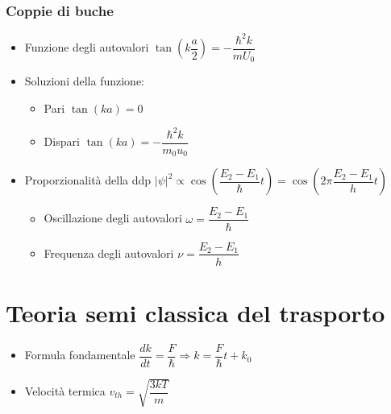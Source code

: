 \documentclass{article}
\begin{document}
\newpage

\subsubsection{Coppie di buche}
\begin{itemize}
  \item Funzione degli autovalori \( \tan\left( k \dfrac{a}{2} \right) = - \dfrac{\hbar ^2 k}{m U_0} \)
  \item Soluzioni della funzione:
        \begin{itemize}
          \item Pari \( \tan \left( ka \right) = 0 \)
          \item Dispari \( \tan \left( ka \right) = - \dfrac{\hbar ^ 2 k}{m_0 u_0}  \)
        \end{itemize}
  \item Proporzionalità della ddp \( \left| \psi \right| ^ 2 \propto \cos \left( \dfrac{E_2 - E_1}{\hbar} t \right) = \cos \left( 2 \pi \dfrac{E_2 - E_1}{h} t \right)  \)
        \begin{itemize}
          \item Oscillazione degli autovalori \( \omega = \dfrac{E_2 - E_1}{\hbar} \)
          \item Frequenza degli autovalori \( \nu = \dfrac{E_2 - E_1}{h} \)
        \end{itemize}
\end{itemize}

\section{Teoria semi classica del trasporto}
\begin{itemize}
  \item Formula fondamentale \( \dfrac{dk}{dt} = \dfrac{F}{\hbar} \Rightarrow k = \dfrac{F}{\hbar} t + k_0 \)
  \item Velocità termica \( \displaystyle v_{th} = \sqrt{\dfrac{3 k T}{m}} \)
\end{itemize}
\end{document}
